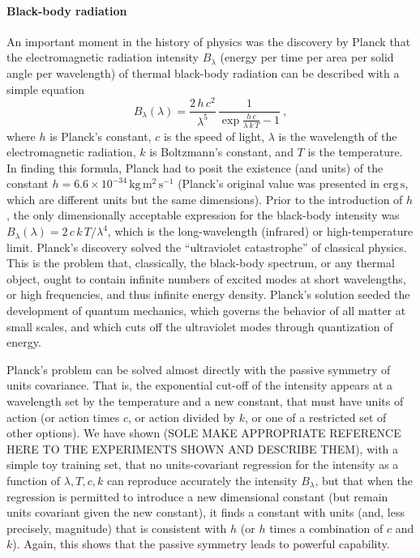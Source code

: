 \documentclass{article}
\theoremstyle{plain}
\theoremstyle{definition}
\theoremstyle{remark}
\newcommand{\unit}[1]{\mathrm{#1}}
\newcommand{\kg}{\unit{kg}}
\newcommand{\m}{\unit{m}}
\newcommand{\s}{\unit{s}}
\begin{document}
\paragraph{Black-body radiation}
An important moment in the history of physics was the discovery by Planck that the electromagnetic radiation intensity $B_\lambda$ (energy per time per area per solid angle per wavelength) of thermal black-body radiation can be described with a simple equation \cite{planck}
\begin{equation}
    B_\lambda(\lambda) = \frac{2\,h\,c^2}{\lambda^5}\,\frac{1}{\exp\frac{h\,c}{\lambda\,k\,T} - 1}~,
\end{equation}
where $h$ is Planck's constant,
$c$ is the speed of light,
$\lambda$ is the wavelength of the electromagnetic radiation,
$k$ is Boltzmann's constant,
and $T$ is the temperature.
In finding this formula, Planck had to posit the existence (and units) of the constant $h=6.6\times 10^{-34}\,\kg\,\m^2\,\s^{-1}$ (Planck's original value was presented in $\mathrm{erg}\,\s$, which are different units but the same dimensions).
Prior to the introduction of $h$, the only dimensionally acceptable expression for the black-body intensity was $B_\lambda(\lambda)=2\,c\,k\,T/\lambda^4$, which is the long-wavelength (infrared) or high-temperature limit.
Planck's discovery solved the ``ultraviolet catastrophe'' of classical physics.
This is the problem that, classically, the black-body spectrum, or any thermal object, ought to contain infinite numbers of excited modes at short wavelengths, or high frequencies, and thus infinite energy density.
Planck's solution seeded the development of quantum mechanics, which governs the behavior of all matter at small scales, and which cuts off the ultraviolet modes through quantization of energy.

Planck's problem can be solved almost directly with the passive symmetry of units covariance.
That is, the exponential cut-off of the intensity appears at a wavelength set by the temperature and a new constant, that must have units of action (or action times $c$, or action divided by $k$, or one of a restricted set of other options).
We have shown (SOLE MAKE APPROPRIATE REFERENCE HERE TO THE EXPERIMENTS SHOWN AND DESCRIBE THEM), with a simple toy training set, that no units-covariant regression for the intensity as a function of $\lambda, T, c, k$ can reproduce accurately the intensity $B_\lambda$, but that when the regression is permitted to introduce a new dimensional constant (but remain units covariant given the new constant), it finds a constant with units (and, less precisely, magnitude) that is consistent with $h$ (or $h$ times a combination of $c$ and $k$).
Again, this shows that the passive symmetry leads to powerful capability.
\end{document}
